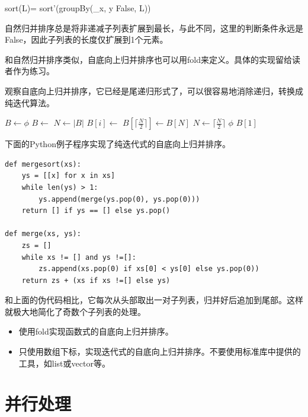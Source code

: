 \documentclass[b5paper]{ctexart}
\begin{document}
\be
sort(L)= sort'(groupBy(\lambda_{x, y} \cdot False, L))
\ee

自然归并排序总是将非递减子列表扩展到最长，与此不同，这里的判断条件永远是False，因此子列表的长度仅扩展到1个元素。

和自然归并排序类似，自底向上归并排序也可以用fold来定义。具体的实现留给读者作为练习。

观察自底向上归并排序，它已经是尾递归形式了，可以很容易地消除递归，转换成纯迭代算法。

\begin{algorithmic}[1]
  \State $B \gets \phi$
    \State $B \gets$ 
  \EndFor
  \State $N \gets |B|$
      \State $B[i] \gets$ 
    \EndFor
      \State $B[\lceil \frac{N}{2} \rceil] \gets B[N]$
    \EndIf
    \State $N \gets \lceil \frac{N}{2} \rceil$
  \EndWhile
    \State \Return $\phi$
  \EndIf
  \State \Return $B[1]$
\EndFunction
\end{algorithmic}

下面的Python例子程序实现了纯迭代式的自底向上归并排序。

\lstset{language=Python}
\begin{lstlisting}
def mergesort(xs):
    ys = [[x] for x in xs]
    while len(ys) > 1:
        ys.append(merge(ys.pop(0), ys.pop(0)))
    return [] if ys == [] else ys.pop()

def merge(xs, ys):
    zs = []
    while xs != [] and ys !=[]:
        zs.append(xs.pop(0) if xs[0] < ys[0] else ys.pop(0))
    return zs + (xs if xs !=[] else ys)
\end{lstlisting}

和上面的伪代码相比，它每次从头部取出一对子列表，归并好后追加到尾部。这样就极大地简化了奇数个子列表的处理。

\begin{Exercise}
\begin{itemize}
\item 使用fold实现函数式的自底向上归并排序。
\item 只使用数组下标，实现迭代式的自底向上归并排序。不要使用标准库中提供的工具，如list或vector等。
\end{itemize}
\end{Exercise}

\section{并行处理}
\end{document}
